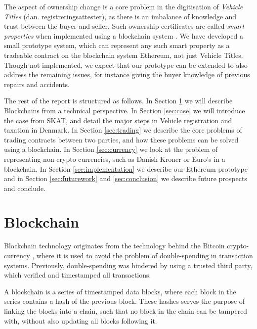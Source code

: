 \documentclass[oneside,a4paper,10pts,article]{memoir}
\begin{document}
The aspect of ownership change is a core problem in the digitisation
of \textit{Vehicle Titles} (dan. registreringsattester), as there is
an imbalance of knowledge and trust between the buyer and seller. Such
ownership certificates are called \textit{smart properties} when
implemented using a blockchain system \cite{bitcoinwiki-smartprop}. We
have developed a small prototype system, which can represent any such
smart property as a tradeable contract on the blockchain system
Ethereum, not just Vehicle Titles. Though not implemented, we expect
that our prototype can be extended to also address the remaining
issues, for instance giving the buyer knowledge of previous repairs
and accidents.

The rest of the report is structured as follows. In Section
\ref{sec:blockchain} we will describe Blockchains from a technical
perspective. In Section \ref{sec:case} we will introduce the case from
SKAT, and detail the major steps in Vehicle registration and taxation
in Denmark. In Section \ref{sec:trading} we describe the core problems
of trading contracts between two parties, and how these problems can
be solved using a blockchain. In Section \ref{sec:currency} we look at
the problem of representing non-crypto currencies, such as Danish
Kroner or Euro's in a blockchain. In Section \ref{sec:implementation}
we describe our Ethereum prototype and in Section \ref{sec:futurework}
and \ref{sec:conclusion} we describe future prospects and conclude.

\chapter{Blockchain}
\label{sec:blockchain}
Blockchain technology originates from the technology behind the
Bitcoin crypto-currency \cite{bitcoin}, where it is used to avoid the
problem of double-spending in transaction systems. Previously,
double-spending was hindered by using a trusted third party, which
verified and timestamped all transactions.

A blockchain is a series of timestamped data blocks, where each block
in the series contains a hash of the previous block. These hashes
serves the purpose of linking the blocks into a chain, such that no
block in the chain can be tampered with, without also updating all
blocks following it.
\end{document}
